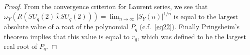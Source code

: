 \documentclass[11 pt, leqno]{amsart}
\newcommand{\wh}{\widehat}
\theoremstyle{definition}
\numberwithin{equation}{section}
\begin{document}
\begin{proof}
From the convergence criterion for Laurent series, we see that $\omega_{Y}(R(SU_q(2)\wh{\star}SU_q(2)))=\lim_{n\to\infty} |S_Y(n)|^{1/n}$ is equal to the largest absolute value of a root of the polynomial $P_q$
(c.f.~\eqref{eq22}). Finally Pringsheim's theorem \cite[Theorem IV.3, p.197]{AnalyticCombinatorics} implies that this value is equal to $r_q$, which was defined to be the largest real root of $P_q$.

\end{proof}
\end{document}
